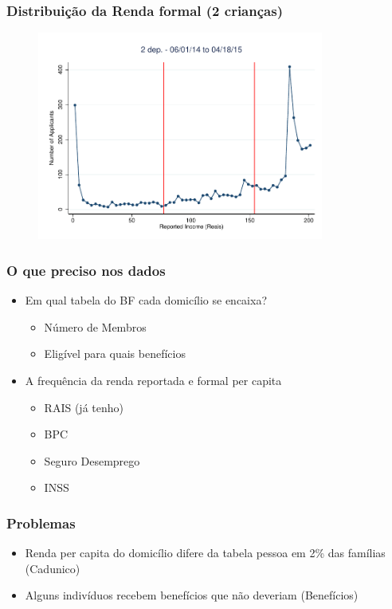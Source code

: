 \documentclass[xcolor=pdftex,dvipsnames,table]{beamer}
\begin{document}
\begin{frame}
\frametitle{Distribui\c{c}\~ao da Renda formal (2 crian\c{c}as)}
\begin{figure}[H]
\begin{center}
\includegraphics[height=2.7in]{Rais_060114_non_2_bin3p5.pdf}
\end{center}
\end{figure}
\end{frame}

\begin{frame}
\frametitle{O que preciso nos dados}
\begin{itemize}
\item Em qual tabela do BF cada domic\'ilio se encaixa?
\begin{itemize}
\item N\'umero de Membros 
\item Elig\'ivel para quais benef\'icios
\end{itemize}
\pause
\item A frequ\^encia da renda reportada e formal per capita
\begin{itemize}
\item RAIS (j\'a tenho)
\item BPC 
\item Seguro Desemprego
\item INSS
\end{itemize}
\end{itemize}
\end{frame}


\begin{frame}
\frametitle{Problemas}
\begin{itemize}
\item Renda per capita do domic\'ilio difere da tabela pessoa em 2\% das fam\'ilias (Cadunico)
\item Alguns indiv\'iduos recebem benef\'icios que n\~ao deveriam (Benef\'icios)
\end{itemize}
\end{frame}
\end{document}
